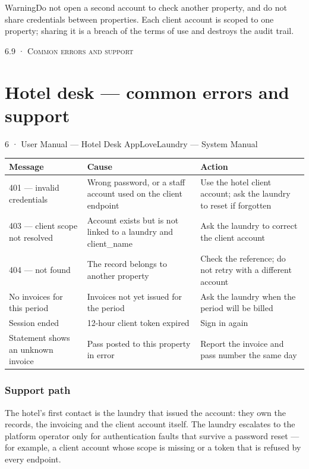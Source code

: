 \documentclass[11pt,a4paper,oneside]{book}
\begin{document}
\begin{notebox}WarningDo not open a second account to check another property, and do not share credentials between properties. Each client account is scoped to one property; sharing it is a breach of the terms of use and destroys the audit trail.\end{notebox}
\textsc{\small\color{crimson}6.9 · Common errors and support}\par\medskip
\section*{Hotel desk — common errors and support}
6 · User Manual — Hotel Desk AppLoveLaundry — System Manual

\begin{center}\small
\begin{tabularx}{\linewidth}{|X|X|X|}
\hline
\rowcolor{lightgrey}
\textbf{Message} & \textbf{Cause} & \textbf{Action} \\ \hline
401 — invalid credentials & Wrong password, or a staff account used on the client endpoint & Use the hotel client account; ask the laundry to reset if forgotten \\ \hline
403 — client scope not resolved & Account exists but is not linked to a laundry and client\_name & Ask the laundry to correct the client account \\ \hline
404 — not found & The record belongs to another property & Check the reference; do not retry with a different account \\ \hline
No invoices for this period & Invoices not yet issued for the period & Ask the laundry when the period will be billed \\ \hline
Session ended & 12-hour client token expired & Sign in again \\ \hline
Statement shows an unknown invoice & Pass posted to this property in error & Report the invoice and pass number the same day \\ \hline
\end{tabularx}
\end{center}
\subsubsection*{Support path}
The hotel's first contact is the laundry that issued the account: they own the records, the invoicing and the client account itself. The laundry escalates to the platform operator only for authentication faults that survive a password reset — for example, a client account whose scope is missing or a token that is refused by every endpoint.
\end{document}
